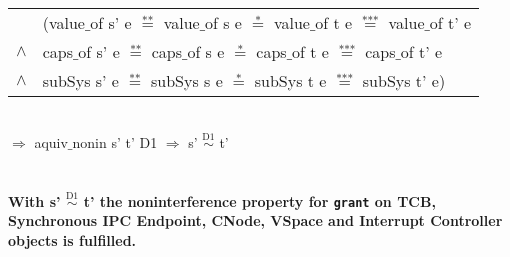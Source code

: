 \begin{tabular}{ll}
& (value$\_$of s' e $\overset{\text{**}}{=}$ value$\_$of s e $\overset{\text{*}}{=}$ value$\_$of t e $\overset{\text{***}}{=}$ value$\_$of t' e \\
$\wedge$ & caps$\_$of s' e $\overset{\text{**}}{=}$ caps$\_$of s e $\overset{\text{*}}{=}$ caps$\_$of t e $\overset{\text{***}}{=}$ caps$\_$of t' e \\
$\wedge$ & subSys s' e $\overset{\text{**}}{=}$ subSys s e $\overset{\text{*}}{=}$ subSys t e $\overset{\text{***}}{=}$ subSys t' e)
\end{tabular} \\
$\Rightarrow$ aquiv$\_$nonin s' t' D1 $\Rightarrow$ s' $\overset{\text{D1}}{\sim}$ t' \\ \\ \\
\textbf{With s' $\overset{\text{D1}}{\sim}$ t' the noninterference property for \texttt{grant} on TCB, Synchronous IPC Endpoint, CNode, VSpace and Interrupt Controller objects is fulfilled.} 
\clearpage
